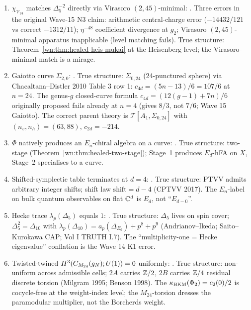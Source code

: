 \begin{theorem}
\begin{enumerate}
\item $\chi_{\mathcal V_{24}}$ matches $\Delta_5^{-2}$ directly via Virasoro $(2, 45)$-minimal: \ClaimStatusRetracted. Three errors in the original Wave-15 N3 claim: arithmetic central-charge error ($-14432/121$ vs correct $-1312/11$); $\eta^{-48}$ coefficient divergence at $g_2$; Virasoro $(2, 45)$-minimal apparatus inapplicable (level matching fails). True structure: Theorem~\ref{wn:thm:healed-heis-mukai} at the Heisenberg level; the Virasoro-minimal match is a mirage.

\item Gaiotto curve $\Sigma_{2, 0}$: \ClaimStatusRetracted. True structure: $\Sigma_{0, 24}$ (24-punctured sphere) via Chacaltana--Distler 2010 Table 3 row 1: $c_{4d} = (5n - 13)/6 = 107/6$ at $n = 24$. The genus-$g$ closed-curve formula $c_{4d} = (12(g-1) + 7n)/6$ originally proposed fails already at $n = 4$ (gives $8/3$, not $7/6$; Wave 15 Gaiotto). The correct parent theory is $\mathcal T[A_1, \Sigma_{0, 24}]$ with $(n_v, n_h) = (63, 88)$, $c_{2d} = -214$.

\item $\Phi$ natively produces an $E_n$-chiral algebra on a curve: \ClaimStatusCorrected. True structure: two-stage (Theorem~\ref{wn:thm:healed-two-stage}); Stage~1 produces $E_d$-hFA on $X$, Stage~2 specialises to a curve.

\item Shifted-symplectic table terminates at $d = 4$: \ClaimStatusCorrected. True structure: PTVV admits arbitrary integer shifts; shift law $\mathrm{shift} = d - 4$ (CPTVV 2017). The $E_n$-label on bulk quantum observables on flat $\mathbb{C}^d$ is $E_d$, not ``$E_{d - 0}$''.

\item Hecke trace $\lambda_p(\Delta_5)$ equals $1$: \ClaimStatusCorrected. True structure: $\Delta_5$ lives on spin cover; $\Delta_5^2 = \Delta_{10}$ with $\lambda_p(\Delta_{10}) = a_p(\Delta_{E_6}) + p^8 + p^9$ (Andrianov--Ikeda; Saito--Kurokawa CAP; Vol I TRUTH I.7). The ``multiplicity-one = Hecke eigenvalue'' conflation is the Wave 14 K1 error.

\item Twisted-twined $H^3(C_{M_{24}}(g_N); U(1)) = 0$ uniformly: \ClaimStatusCorrected. True structure: non-uniform across admissible cells; $2A$ carries $\mathbb{Z}/2$, $2B$ carries $\mathbb{Z}/4$ residual discrete torsion (Milgram 1995; Benson 1998). The $\kappa_{\mathrm{BKM}}(\Phi_2) = c_2(0)/2$ is cocycle-free at the weight-index level; the $M_{24}$-torsion dresses the paramodular multiplier, not the Borcherds weight.
\end{enumerate}
\end{theorem}

